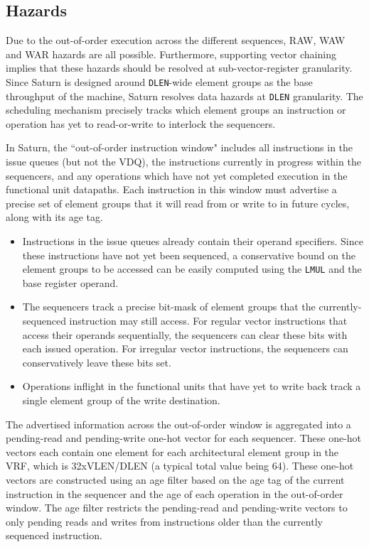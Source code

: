 \subsection{Hazards}

Due to the out-of-order execution across the different sequences, RAW, WAW and WAR hazards are all possible.
Furthermore, supporting vector chaining implies that these hazards should be resolved at sub-vector-register granularity.
Since Saturn is designed around \texttt{DLEN}-wide element groups as the base throughput of the machine, Saturn resolves data hazards at \texttt{DLEN} granularity.
The scheduling mechanism precisely tracks which element groups an instruction or operation has yet to read-or-write to interlock the sequencers.

In Saturn, the ``out-of-order instruction window" includes all instructions in the issue queues (but not the VDQ), the instructions currently in progress within the sequencers, and any operations which have not yet completed execution in the functional unit datapaths.
Each instruction in this window must advertise a precise set of element groups that it will read from or write to in future cycles, along with its age tag.

\begin{itemize}
\item Instructions in the issue queues already contain their operand specifiers. Since these instructions have not yet been sequenced, a conservative bound on the element groups to be accessed can be easily computed using the \texttt{LMUL} and the base register operand.
\item The sequencers track a precise bit-mask of element groups that the currently-sequenced instruction may still access. For regular vector instructions that access their operands sequentially, the sequencers can clear these bits with each issued operation. For irregular vector instructions, the sequencers can conservatively leave these bits set.
\item Operations inflight in the functional units that have yet to write back track a single element group of the write destination.
\end{itemize}
 
The advertised information across the out-of-order window is aggregated into a pending-read and pending-write one-hot vector for each sequencer.
These one-hot vectors each contain one element for each architectural element group in the VRF, which is 32xVLEN/DLEN (a typical total value being 64).
These one-hot vectors are constructed using an age filter based on the age tag of the current instruction in the sequencer and the age of each operation in the out-of-order window.
The age filter restricts the pending-read and pending-write vectors to only pending reads and writes from instructions older than the currently sequenced instruction.

